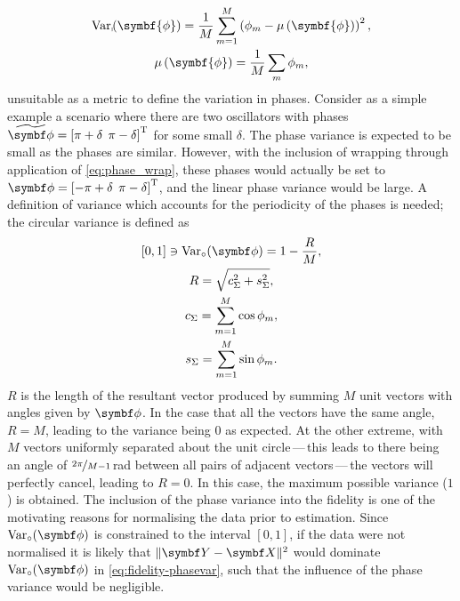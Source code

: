 \begin{subequations}
    \begin{gather}
        \Var_{\shortmid}\hspace*{-3pt}\left(\symbf{\phi}\right) =
            \frac{1}{M} \sum_{m=1}^{M} \left(\phi_m - \mu\left(\symbf{\phi}\right)\right)^2, \\
        \mu\left(\symbf{\phi}\right) = \frac{1}{M} \sum_{m} \phi_m,
    \end{gather}
\end{subequations}
unsuitable as a metric to define the variation in phases. Consider as a simple
example a scenario
where there are two oscillators with phases $\widetilde{\bdphi} = \left[ \pi +
\delta\:\:\pi - \delta \right]\T$ for some small $\delta$.
The phase variance is expected to be small as the phases are similar.
However, with the inclusion of wrapping through application of
\cref{eq:phase_wrap}, these phases would actually be set to $\bdphi = \left[
    -\pi
+ \delta\:\:\pi - \delta \right]\T$, and the linear phase
variance would be large. A definition of variance which accounts for the
periodicity of the phases is needed; the circular variance is defined
as~\cite[Chapter 3]{Fisher1993}
\begin{subequations}
    \begin{gather}
        [0, 1] \ni \circvar = 1 - \frac{R}{M},\\
        R = \sqrt{c_{\Sigma}^2 + s_{\Sigma}^2}, \\
        c_{\Sigma} = \sum_{m=1}^M \cos \phi_m, \\
        s_{\Sigma} = \sum_{m=1}^M \sin \phi_m.
    \end{gather}
\end{subequations}
$R$ is the length of the resultant vector produced by summing $M$ unit vectors
with angles given by $\bdphi$. In the case that all the vectors have the
same angle, $R=M$, leading to the variance being $0$ as expected. At the other
extreme, with $M$ vectors uniformly separated about the unit circle\,---\,this leads to there being an angle of $\nicefrac{2 \pi}{M - 1}$\,\unit{\radian} between all
pairs of adjacent vectors\,---\,the
vectors will perfectly cancel, leading to $R=0$. In this case, the maximum
possible variance ($1$) is obtained.
The inclusion of the phase variance into the fidelity is one of the
motivating reasons for normalising the data prior to estimation. Since
$\circvar$ is constrained to the interval $[0, 1]$, if the data were not
normalised it is likely that $\lVert \bY - \bX \rVert^2$ would dominate
$\circvar$ in \cref{eq:fidelity-phasevar}, such that the influence of the phase
variance would be negligible.

